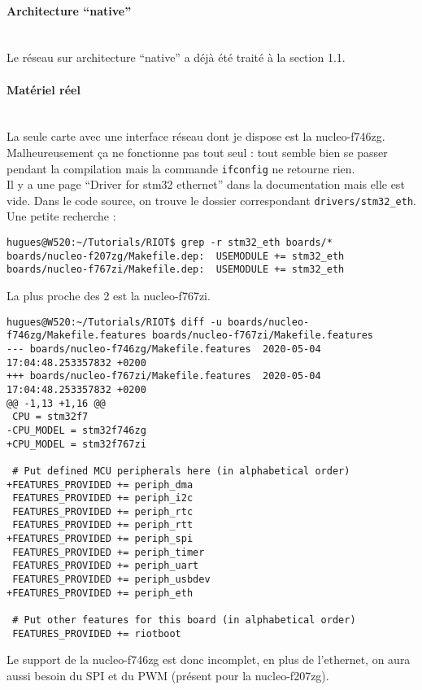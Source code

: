 \paragraph{Architecture \enquote{native}\\\\}
Le réseau sur architecture \enquote{native} a déjà été traité à la
section 1.1.

\paragraph{Matériel réel\\\\}
La seule carte avec une interface réseau dont je dispose est la
nucleo-f746zg.\\

Malheureusement ça ne fonctionne pas tout seul : tout semble bien se
passer pendant la compilation mais la commande \texttt{ifconfig} ne
retourne rien.\\

Il y a une page \enquote{Driver for stm32 ethernet} dans la
documentation mais elle est vide. Dans le code source, on trouve le
dossier correspondant \texttt{drivers/stm32\_eth}.\\

Une petite recherche :
\begin{verbatim}
hugues@W520:~/Tutorials/RIOT$ grep -r stm32_eth boards/*
boards/nucleo-f207zg/Makefile.dep:  USEMODULE += stm32_eth
boards/nucleo-f767zi/Makefile.dep:  USEMODULE += stm32_eth
\end{verbatim}

La plus proche des 2 est la nucleo-f767zi.
{\scriptsize
\begin{verbatim}
hugues@W520:~/Tutorials/RIOT$ diff -u boards/nucleo-f746zg/Makefile.features boards/nucleo-f767zi/Makefile.features 
--- boards/nucleo-f746zg/Makefile.features	2020-05-04 17:04:48.253357832 +0200
+++ boards/nucleo-f767zi/Makefile.features	2020-05-04 17:04:48.253357832 +0200
@@ -1,13 +1,16 @@
 CPU = stm32f7
-CPU_MODEL = stm32f746zg
+CPU_MODEL = stm32f767zi
 
 # Put defined MCU peripherals here (in alphabetical order)
+FEATURES_PROVIDED += periph_dma
 FEATURES_PROVIDED += periph_i2c
 FEATURES_PROVIDED += periph_rtc
 FEATURES_PROVIDED += periph_rtt
+FEATURES_PROVIDED += periph_spi
 FEATURES_PROVIDED += periph_timer
 FEATURES_PROVIDED += periph_uart
 FEATURES_PROVIDED += periph_usbdev
+FEATURES_PROVIDED += periph_eth
 
 # Put other features for this board (in alphabetical order)
 FEATURES_PROVIDED += riotboot
\end{verbatim}
}
Le support de la nucleo-f746zg est donc incomplet, en plus de l'ethernet,
on aura aussi besoin du SPI et du PWM (présent pour la nucleo-f207zg).\\


